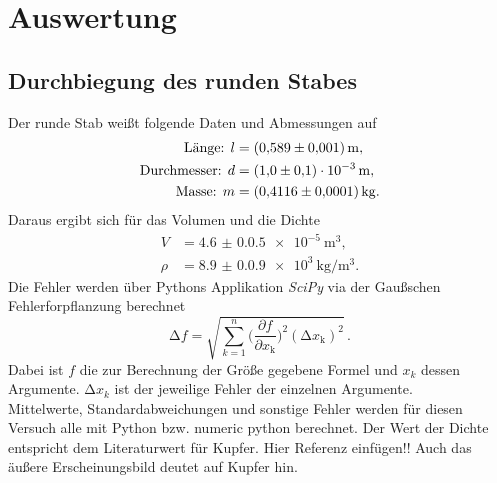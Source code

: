 \section{Auswertung}
\label{sec:Auswertung}
\subsection{Durchbiegung des runden Stabes}
Der runde Stab weißt folgende Daten und Abmessungen auf
\begin{align*}
    \text{Länge: } l&=\qty{0,589(0.001)}{\meter},\\
    \text{Durchmesser: } d&=\qty{1,0(0,1)e-3}{\meter},\\
    \text{Masse: } m&=\qty{0,4116(0.0001)}{\kilo\gram}.
\end{align*}
Daraus ergibt sich für das Volumen und die Dichte 
\begin{align*}
    V&=\qty{4.6(0.05)e-5}{\meter\cubed},\\
    \rho&=\qty{8.9(0.09)e3}{\kilo\gram\per\meter\cubed}.
\end{align*}
Die Fehler werden über Pythons Applikation \textit{SciPy} via der Gaußschen 
Fehlerforpflanzung berechnet
\begin{equation}
    \increment f=\sqrt{\sum_{k=1}^{n}\biggl(\frac{\partial f}{\partial x_\text{k}}\biggr)^2(\increment x_\text{k})^2}\,.
    \label{eq:gauss}
    \end{equation}
Dabei ist $f$ die zur Berechnung der Größe gegebene Formel und $x_k$ dessen Argumente.
$\increment x_k$ ist der jeweilige Fehler der einzelnen Argumente.\\ 
Mittelwerte, Standardabweichungen und sonstige Fehler werden für diesen Versuch alle mit Python bzw. 
numeric python berechnet. \noindent 
Der Wert der Dichte entspricht dem Literaturwert für Kupfer. Hier Referenz einfügen!!
Auch das äußere Erscheinungsbild deutet auf Kupfer hin.
